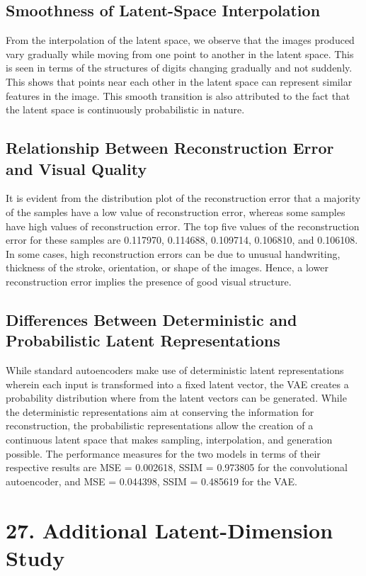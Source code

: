 \documentclass[10pt]{article}
\begin{document}
\subsection*{Smoothness of Latent-Space Interpolation}
From the interpolation of the latent space, we observe that the images produced vary gradually while moving from one point to another in the latent space. This is seen in terms of the structures of digits changing gradually and not suddenly. This shows that points near each other in the latent space can represent similar features in the image. This smooth transition is also attributed to the fact that the latent space is continuously probabilistic in nature.

\subsection*{Relationship Between Reconstruction Error and Visual Quality}
It is evident from the distribution plot of the reconstruction error that a majority of the samples have a low value of reconstruction error, whereas some samples have high values of reconstruction error. The top five values of the reconstruction error for these samples are 0.117970, 0.114688, 0.109714, 0.106810, and 0.106108. In some cases, high reconstruction errors can be due to unusual handwriting, thickness of the stroke, orientation, or shape of the images. Hence, a lower reconstruction error implies the presence of good visual structure.

\subsection*{Differences Between Deterministic and Probabilistic Latent Representations}
While standard autoencoders make use of deterministic latent representations wherein each input is transformed into a fixed latent vector, the VAE creates a probability distribution where from the latent vectors can be generated. While the deterministic representations aim at conserving the information for reconstruction, the probabilistic representations allow the creation of a continuous latent space that makes sampling, interpolation, and generation possible. The performance measures for the two models in terms of their respective results are MSE = 0.002618, SSIM = 0.973805 for the convolutional autoencoder, and MSE = 0.044398, SSIM = 0.485619 for the VAE.
\section*{27. Additional Latent-Dimension Study}
\end{document}
